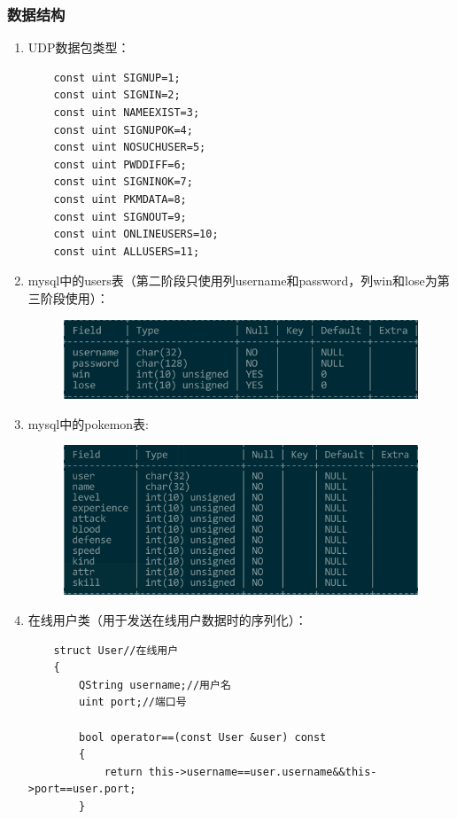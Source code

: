 \documentclass{ctexart}
\begin{document}
\subsubsection{数据结构}
\label{sec:datastruct}
\begin{enumerate}
  \item UDP数据包类型：
  \lstset{language=C++}
  \begin{lstlisting}
    const uint SIGNUP=1;
    const uint SIGNIN=2;
    const uint NAMEEXIST=3;
    const uint SIGNUPOK=4;
    const uint NOSUCHUSER=5;
    const uint PWDDIFF=6;
    const uint SIGNINOK=7;
    const uint PKMDATA=8;
    const uint SIGNOUT=9;
    const uint ONLINEUSERS=10;
    const uint ALLUSERS=11;
  \end{lstlisting}
  \item mysql中的users表（第二阶段只使用列username和password，列win和lose为第三阶段使用）：
  \begin{figure}[H]
    \centering
    \includegraphics[width=15cm]{users.png}
  \end{figure}
  \item mysql中的pokemon表:
  \begin{figure}[H]
    \centering
    \includegraphics[width=15cm]{pokemon.png}
  \end{figure}
  \item 在线用户类（用于发送在线用户数据时的序列化）：
  \lstset{language=C++}
  \begin{lstlisting}
    struct User//在线用户
    {
        QString username;//用户名
        uint port;//端口号

        bool operator==(const User &user) const
        {
            return this->username==user.username&&this->port==user.port;
        }


\end{lstlisting}
\end{enumerate}
\end{document}
